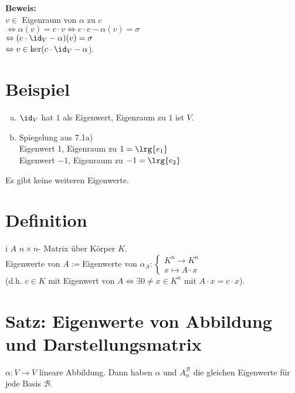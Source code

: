   \textbf{Beweis:}\\
  $v\in$ Eigenraum von $\alpha$ zu $c$\\
  $\Leftrightarrow\alpha(v)=c\cdot v\Leftrightarrow c\cdot
  v-\alpha(v)=\sigma$\\
  $\Leftrightarrow(c\cdot\id_V-\alpha)(v)=\sigma$\\
  $\Leftrightarrow v\in\mbox{ker}(c\cdot\id_V-\alpha$).

\section{Beispiel}
  \begin{enumerate}[a)]
    \item $\id_V$ hat $1$ als Eigenwert, Eigenraum zu $1$ ist $V$.
    \item Spiegelung aus 7.1a)\\
      Eigenwert 1, Eigenraum zu $1=\lrg{e_1}$\\
      Eigenwert $-1$, Eigenraum zu $-1=\lrg{e_2}$
  \end{enumerate}

  Es gibt keine weiteren Eigenwerte.

\section{Definition}
  i $A$ $n\times n$- Matrix über Körper $K$.\\
  Eigenwerte von $A:=$Eigenwerte von $\alpha_A:\begin{cases}K^n\rightarrow
  K^n\\ x\mapsto A\cdot x\end{cases}$\\
  (d.h. $c\in K$ mit Eigenwert von $A\Leftrightarrow\exists 0\neq x\in K^n$ mit
  $A\cdot x=c\cdot x$).

\section{Satz: Eigenwerte von Abbildung und Darstellungsmatrix}
  $\alpha: V\rightarrow V$ lineare Abbildung. Dann haben $\alpha$ und
  $A_\alpha^{\mathcal{B}}$ die gleichen Eigenwerte für jede Basis ${\mathcal{B}}$.

